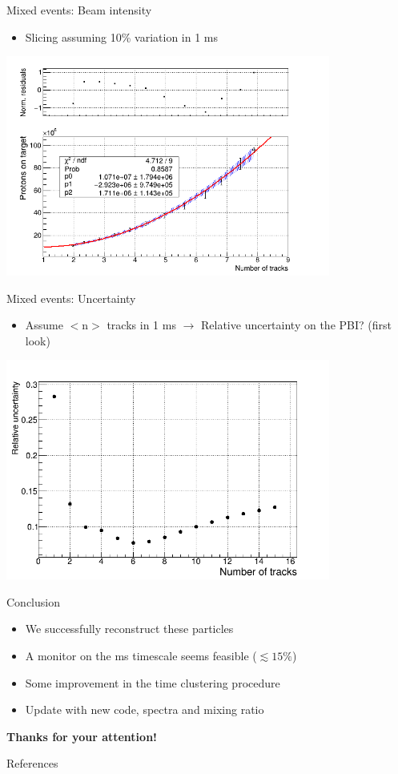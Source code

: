 \documentclass[10pt]{beamer}
\begin{document}
%
\begin{frame}{Mixed events: Beam intensity}
\begin{itemize}
\item Slicing assuming 10\% variation in 1 ms
\end{itemize}
\begin{center}
\includegraphics[width=0.8\textwidth]{plots/mix/pol2-fit}
\end{center}
\end{frame}

%
\begin{frame}{Mixed events: Uncertainty}
\begin{itemize}
\item Assume $<$n$>$ tracks in 1 ms $\rightarrow$ Relative uncertainty on the PBI? (first look)
\end{itemize}
\begin{center}
\includegraphics[width=0.8\textwidth]{plots/mix/uncertainty}
\end{center}
\end{frame}

%
\begin{frame}{Conclusion}
\begin{itemize}
\setlength\itemsep{0.4cm}
\item We successfully reconstruct these particles
\item A monitor on the ms timescale seems feasible ($\lesssim 15 \%$) 
\item Some improvement in the time clustering procedure
\item Update with new code, spectra and mixing ratio
\end{itemize}
\vspace{1cm}
\centering
{\large \textbf{Thanks for your attention!}}
\end{frame}

\begin{frame}[allowframebreaks]{References}
\printbibliography[heading=none]
\end{frame}
\end{document}
